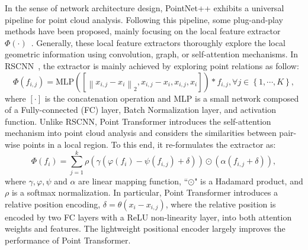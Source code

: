In the sense of network architecture design, PointNet++ exhibits a universal pipeline for point cloud analysis. Following this pipeline, some plug-and-play methods have been proposed, mainly focusing on the local feature extractor $\Phi\left(\cdot\right)$~\citep{xu2021paconv,liu2019relation,thomas2019kpconv,zhao2021point}.
Generally, these local feature extractors thoroughly explore the local geometric information using convolution, graph, or self-attention mechanisms. In RSCNN~\citep{liu2019relation}, the extractor is mainly achieved by exploring point relations as follow:
\begin{equation}
    \Phi\left(f_{i,j}\right) = \mathrm{MLP}\left(\left[\left \| x_{i,j}-x_i \right \|_2, x_{i,j}-x_i, x_{i,j}, x_i\right]\right)*f_{i,j},  \forall j \in \left\{1,\cdots, K\right\},
\end{equation}
where $[\cdot]$ is the concatenation operation and MLP is a small network composed of a Fully-connected (FC) layer, Batch Normalization layer, and activation function. Unlike RSCNN, Point Transformer introduces the self-attention mechanism into point cloud analysis and considers the similarities between pair-wise points in a local region. To this end, it re-formulates the extractor as:
\begin{equation}
    \Phi\left(f_{i}\right) =\sum_{j=1}^{k}\rho \left ( \gamma \left ( \varphi \left ( f_i \right )-\psi \left ( f_{i,j} \right )+\delta \right ) \right )\odot \left ( \alpha \left ( f_{i,j}+\delta  \right ) \right ),
    \label{eq:point_transformer}
\end{equation}
where $\gamma, \varphi, \psi$ and $\alpha$ are linear mapping function, ``$\odot$" is a Hadamard product, and $\rho$ is a softmax normalization. In particular, Point Transformer introduces a relative position encoding, $\delta=\theta\left(x_i-x_{i,j} \right)$, where the relative position is encoded by two FC layers with a ReLU non-linearity layer, into both attention weights and features. The lightweight positional encoder largely improves the performance of Point Transformer.

